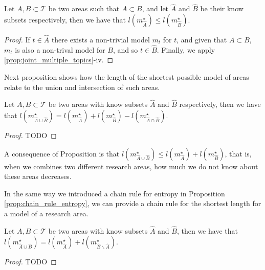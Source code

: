 \begin{proposition}
Let $A, B \subset \mathcal{T}$ be two areas such that $A \subset B$, and let $\hat{A}$ and $\hat{B}$ be their know subsets respectively, then we have that $l \left( m_{\hat{A}}^{\star} \right) \leq l \left( m_{\hat{B}}^{\star} \right)$.
\end{proposition}
\begin{proof}
If $t \in \hat{A}$ there exists a non-trivial model $m_t$ for $t$, and given that $A \subset B$, $m_t$ is also a non-trival model for $B$, and so $t \in \hat{B}$. Finally, we apply \ref{prop:joint_multiple_topics}-iv.
\end{proof}

Next proposition \label{prop:areas_union} shows how the length of the shortest possible model of areas relate to the union and intersection of such areas.

\begin{proposition}
\label{prop:areas_union}
Let $A, B \subset \mathcal{T}$ be two areas with know subsets $\hat{A}$ and $\hat{B}$ respectively, then we have that $l \left( m_{\hat{A} \cup \hat{B}}^{\star} \right) = l \left( m_{\hat{A}}^{\star} \right) + l \left( m_{\hat{B}}^{\star} \right) - l \left( m_{\hat{A} \cap \hat{B}}^{\star} \right)$.
\end{proposition}
\begin{proof}
{\color{red} TODO}
\end{proof}

A consequence of Proposition \label{prop:areas_union} is that $l \left( m_{\hat{A} \cup \hat{B}}^{\star} \right) \leq l \left( m_{\hat{A}}^{\star} \right) + l \left( m_{\hat{B}}^{\star} \right)$, that is, when we combines two different research areas, how much we do not know about these areas decreases.

In the same way we introduced a chain rule for entropy in Proposition \ref{prop:chain_rule_entropy}, we can provide a chain rule for the shortest length for a model of a research area.

\begin{proposition}
Let $A, B \subset \mathcal{T}$ be two areas with know subsets $\hat{A}$ and $\hat{B}$, then we have that $l \left( m_{\hat{A} \cup \hat{B}}^{\star} \right) = l \left( m_{\hat{A}}^{\star} \right) + l \left( m_{\hat{B} \backslash \hat{A}}^{\star} \right)$.
\end{proposition}
\begin{proof}
{\color{red} TODO}
\end{proof}

